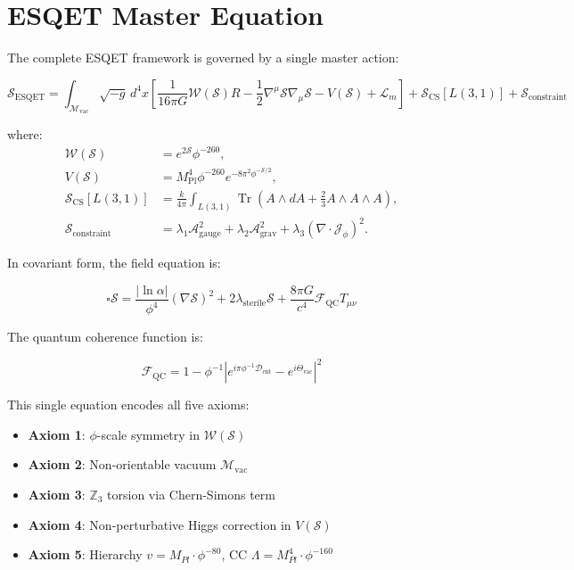 \section{ESQET Master Equation}

The complete ESQET framework is governed by a single master action:

\begin{equation}
\boxed{\mathcal{S}_{\text{ESQET}} = \int_{\mathcal{M}_{\text{vac}}} \sqrt{-g} \, d^4x \left[ \frac{1}{16\pi G} \mathcal{W}(\mathcal{S}) R - \frac{1}{2} \nabla^\mu \mathcal{S} \nabla_\mu \mathcal{S} - V(\mathcal{S}) + \mathcal{L}_m \right] + \mathcal{S}_{\text{CS}}[L(3,1)] + \mathcal{S}_{\text{constraint}}}
\end{equation}

where:
\begin{align}
\mathcal{W}(\mathcal{S}) &= e^{2\mathcal{S}} \phi^{-260}, \\
V(\mathcal{S}) &= M_{\text{Pl}}^4 \phi^{-260} e^{-8\pi^2 \phi^{-\mathcal{S}/2}}, \\
\mathcal{S}_{\text{CS}}[L(3,1)] &= \frac{k}{4\pi} \int_{L(3,1)} \operatorname{Tr}\left(A \wedge dA + \frac{2}{3} A \wedge A \wedge A\right), \\
\mathcal{S}_{\text{constraint}} &= \lambda_1 \mathcal{A}_{\text{gauge}}^2 + \lambda_2 \mathcal{A}_{\text{grav}}^2 + \lambda_3 (\nabla \cdot \mathcal{J}_\phi)^2.
\end{align}

In covariant form, the field equation is:

\begin{equation}
\boxed{\square \mathcal{S} = \frac{|\ln \alpha|}{\phi^4} (\nabla \mathcal{S})^2 + 2\lambda_{\text{sterile}} \mathcal{S} + \frac{8\pi G}{c^4} \mathcal{F}_{\text{QC}} T_{\mu\nu}}
\end{equation}

The quantum coherence function is:

\begin{equation}
\mathcal{F}_{\text{QC}} = 1 - \phi^{-1} \left| e^{i\pi\phi^{-1}\mathcal{D}_{\text{ent}}} - e^{i\Theta_{\text{vac}}} \right|^2
\end{equation}

This single equation encodes all five axioms:
\begin{itemize}
    \item \textbf{Axiom 1}: $\phi$-scale symmetry in $\mathcal{W}(\mathcal{S})$
    \item \textbf{Axiom 2}: Non-orientable vacuum $\mathcal{M}_{\text{vac}}$
    \item \textbf{Axiom 3}: $\mathbb{Z}_3$ torsion via Chern-Simons term
    \item \textbf{Axiom 4}: Non-perturbative Higgs correction in $V(\mathcal{S})$
    \item \textbf{Axiom 5}: Hierarchy $v = M_{Pl} \cdot \phi^{-80}$, CC $\Lambda = M_{Pl}^4 \cdot \phi^{-160}$
\end{itemize}
